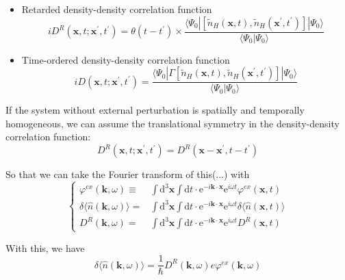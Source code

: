 \begin{itemize}
\item Retarded density-density correlation function
\begin{equation*} \label{Eqs3.1.12'} \tag{3.1.12'}
i D^R(\mathbf{x},t;\mathbf{x}^{'},t^{'}) = \theta(t-t^{'}) \times \frac{\langle \Psi_0 | [\tilde{n}_H(\mathbf{x},t), \tilde{n}_H(\mathbf{x}^{'},t^{'})] | \Psi_0 \rangle}{\langle \Psi_0 | \Psi_0 \rangle}
\end{equation*}

\item Time-ordered density-density correlation function
\begin{equation*} \label{Eqs2.8.2'} \tag{2.8.2'}
i D(\mathbf{x},t;\mathbf{x}^{'},t^{'}) = \frac{\langle \Psi_0 | \Gamma[\tilde{n}_H(\mathbf{x},t), \tilde{n}_H(\mathbf{x}^{'},t^{'})] | \Psi_0 \rangle}{\langle \Psi_0 | \Psi_0 \rangle}
\end{equation*}
\end{itemize}

If the system without external perturbation is spatially and temporally homogeneous, we can assume the translational symmetry in the density-density correlation function:
\begin{equation} \label{Eqs3.1.13}
D^R(\mathbf{x},t;\mathbf{x}^{'},t^{'}) = D^R(\mathbf{x}-\mathbf{x}^{'},t-t^{'})
\end{equation}

So that we can take the Fourier transform of this(...) with
\begin{equation} \label{Eqs3.1.14}
\left\{ \begin{aligned}
\varphi^{ex}(\mathbf{k},\omega) \equiv& \int \mathrm{d}^3 \mathbf{x} \int \mathrm{d} t\cdot \mathrm{e}^{-i \mathbf{k} \cdot \mathbf{x}} \mathrm{e}^{i \omega t} \varphi^{ex}(\mathbf{x},t)\\
\delta \langle \hat{n}(\mathbf{k},\omega) \rangle =& \int \mathrm{d}^3 \mathbf{x} \int \mathrm{d} t\cdot \mathrm{e}^{-i \mathbf{k} \cdot \mathbf{x}} \mathrm{e}^{i \omega t} \delta \langle \hat{n}(\mathbf{x},t) \rangle\\
D^R(\mathbf{k},\omega) =& \int \mathrm{d}^3 \mathbf{x} \int \mathrm{d} t\cdot \mathrm{e}^{-i \mathbf{k} \cdot \mathbf{x}} \mathrm{e}^{i \omega t} D^R(\mathbf{x},t)
\end{aligned} \right.
\end{equation}

With this, we have
\begin{equation} \label{Eqs3.1.15}
\delta \langle \hat{n}(\mathbf{k},\omega) \rangle = \frac{1}{\hbar} D^R(\mathbf{k},\omega) e \varphi^{ex}(\mathbf{k},\omega)
\end{equation}

